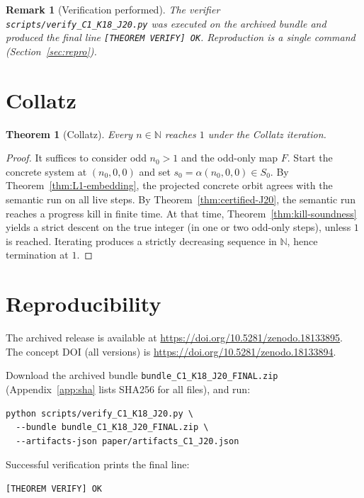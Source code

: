 \documentclass[11pt]{article}
\newtheorem{theorem}{Theorem}
\newtheorem{remark}{Remark}
\begin{document}
\begin{remark}[Verification performed]
The verifier \texttt{scripts/verify\_C1\_K18\_J20.py} was executed on the archived bundle and produced the final line
\texttt{[THEOREM VERIFY] OK}. Reproduction is a single command (Section~\ref{sec:repro}).
\end{remark}

\section{Collatz}

\begin{theorem}[Collatz]
Every $n\in\mathbb{N}$ reaches $1$ under the Collatz iteration.
\end{theorem}

\begin{proof}
It suffices to consider odd $n_0>1$ and the odd-only map $F$.
Start the concrete system at $(n_0,0,0)$ and set $s_0=\alpha(n_0,0,0)\in S_0$.
By Theorem~\ref{thm:L1-embedding}, the projected concrete orbit agrees with the semantic run on all live steps.
By Theorem~\ref{thm:certified-J20}, the semantic run reaches a progress kill in finite time.
At that time, Theorem~\ref{thm:kill-soundness} yields a strict descent on the true integer (in one or two odd-only steps),
unless $1$ is reached. Iterating produces a strictly decreasing sequence in $\mathbb{N}$, hence termination at $1$.
\end{proof}

\section{Reproducibility}
The archived release is available at \url{https://doi.org/10.5281/zenodo.18133895}.
The concept DOI (all versions) is \url{https://doi.org/10.5281/zenodo.18133894}.

Download the archived bundle \texttt{bundle\_C1\_K18\_J20\_FINAL.zip} (Appendix~\ref{app:sha} lists SHA256 for all files),
and run:

\begin{lstlisting}
python scripts/verify_C1_K18_J20.py \
  --bundle bundle_C1_K18_J20_FINAL.zip \
  --artifacts-json paper/artifacts_C1_J20.json
\end{lstlisting}

Successful verification prints the final line:
\begin{lstlisting}
[THEOREM VERIFY] OK
\end{lstlisting}


\end{document}
